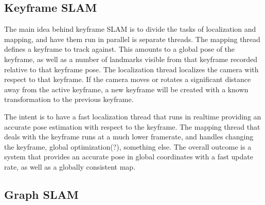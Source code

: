 \subsection{Keyframe SLAM}

The main idea behind keyframe SLAM is to divide the tasks of localization and mapping, and have
them run in parallel is separate threads.  The mapping thread defines a keyframe to track against. 
This amounts to a global pose of the keyframe, as well as a number of landmarks visible from that
keyframe recorded relative to that keyframe pose.  The localization thread localizes the camera
with respect to that keyframe.  If the camera moves or rotates a significant distance away from
the active keyframe, a new keyframe will be created with a known transformation to the previous
keyframe.

The intent is to have a fast localization thread that runs in realtime providing an accurate pose
estimation with respect to the keyframe.  The mapping thread that deals with the keyframe runs at a
much lower framerate, and handles changing the keyframe, global optimization(?), something else. 
The overall outcome is a system that provides an accurate pose in global coordinates with a fast
update rate, as well as a globally consistent map.

\subsection{Graph SLAM}
\label{subsec:graph_slam}
